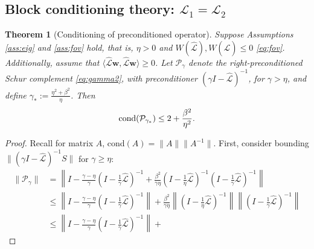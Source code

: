 \documentclass[a4paper,10pt]{article}
\newtheorem{theorem}{Theorem}
\begin{document}
{%
\subsection{Block conditioning theory: $\mathcal{L}_1 = \mathcal{L}_2$}
%
\begin{theorem}[Conditioning of preconditioned operator]\label{th:cond}
Suppose Assumptions \ref{ass:eig} and \ref{ass:fov} hold, that is, $\eta > 0$
and $W(\widehat{\mathcal{L}}),W(\widehat{\mathcal{L}}) \leq 0$ \eqref{eq:fov}.
Additionally, assume that $\langle\widehat{\mathcal{L}}\mathbf{w},
\widehat{\mathcal{L}}\mathbf{w}\rangle\geq 0$. Let $\mathcal{P}_\gamma$
denote the right-preconditioned Schur complement \eqref{eq:gamma2}, with
preconditioner $(\gamma I - \widehat{\mathcal{L}})^{-1}$, for $\gamma >\eta$,
and define $\gamma_* := \tfrac{\eta^2+\beta^2}{\eta}$. Then
\begin{align}\label{eq:gammastar_cond}
\textnormal{cond}(\mathcal{P}_{\gamma_*}) \leq 
	2 + \frac{\beta^2}{\eta^2}.
\end{align}
\end{theorem}
\begin{proof}
Recall for matrix $A$, cond$(A) = \|A\|\|A^{-1}\|$.
First, consider bounding $\|(\gamma I- \widehat{\mathcal{L}})^{-1}S\|$ for
$\gamma \geq \eta$:
%
\begin{align}\nonumber
\|\mathcal{P}_\gamma\| & = \left\| I - \frac{\gamma - \eta}{\gamma}
	( I- \tfrac{1}{\gamma}\widehat{\mathcal{L}})^{-1} + 
	\frac{\beta^2}{\gamma\eta}( I- \tfrac{1}{\eta}\widehat{\mathcal{L}})^{-1}
	( I- \tfrac{1}{\gamma}\widehat{\mathcal{L}})^{-1} \right\| \\
& \leq \left\| I - \frac{\gamma-\eta}
	{\gamma}\left(I - \tfrac{1}{\gamma}\widehat{\mathcal{L}}\right)^{-1}\right\| +
		\frac{\beta^2}{\gamma\eta}
		\left\|( I- \tfrac{1}{\eta}\widehat{\mathcal{L}})^{-1} \right\|
		\left\|( I- \tfrac{1}{\gamma}\widehat{\mathcal{L}})^{-1}\right\|\nonumber \\
& \leq \left\| I - \frac{\gamma-\eta}
	{\gamma}\left(I - \tfrac{1}{\gamma}\widehat{\mathcal{L}}\right)^{-1}\right\| +

\end{align}
\end{proof}}
\end{document}
